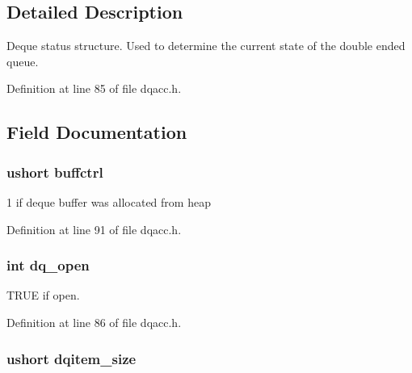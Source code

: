 \subsection{Detailed Description}
Deque status structure. Used to determine the current state of the double ended queue. 

Definition at line 85 of file dqacc.\-h.



\subsection{Field Documentation}
\hypertarget{struct__dq__statbuff_a9f1a8e591d86f4e9e40c723dbb9f1d34}{
\subsubsection[{buffctrl}]{\setlength{\rightskip}{0pt plus 5cm}ushort buffctrl}}\label{struct__dq__statbuff_a9f1a8e591d86f4e9e40c723dbb9f1d34}


1 if deque buffer was allocated from heap 



Definition at line 91 of file dqacc.\-h.

\hypertarget{struct__dq__statbuff_a2cfb815275868f448170339b01fb68a6}{
\subsubsection[{dq\-\_\-open}]{\setlength{\rightskip}{0pt plus 5cm}int dq\-\_\-open}}\label{struct__dq__statbuff_a2cfb815275868f448170339b01fb68a6}


T\-R\-U\-E if open. 



Definition at line 86 of file dqacc.\-h.

\hypertarget{struct__dq__statbuff_a40241a744320a331e0a0c37ecc1a7b8b}{
\subsubsection[{dqitem\-\_\-size}]{\setlength{\rightskip}{0pt plus 5cm}ushort dqitem\-\_\-size}}\label{struct__dq__statbuff_a40241a744320a331e0a0c37ecc1a7b8b}


